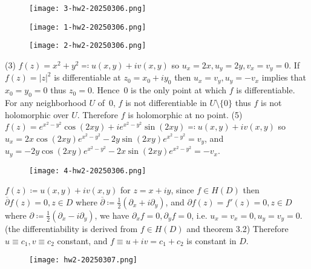 \begin{definition}[解析函数]
\begin{figure}[H]
\centering
\texttt{[image: 3-hw2-20250306.png]}
\label{}
\end{figure}
\end{definition}
\begin{theorem}
\begin{figure}[H]
\centering
\texttt{[image: 1-hw2-20250306.png]}
\label{}
\end{figure}
\end{theorem}
\begin{theorem}
\begin{figure}[H]
\centering
\texttt{[image: 2-hw2-20250306.png]}
\label{}
\end{figure}
\end{theorem}
(3) $f (z)=x^{2}+y^{2}\eqqcolon u (x, y)+i v(x,y)$ so $u_{x}=2x,u_{y}=2y,v_{x}=v_{y}=0$. If $f(z)=\lvert z \rvert ^{2}$ is differentiable at $z_0=x_0+iy_0$ then $u_{x}=v_{y},u_{y}=-v_{x}$ implies that $x_0=y_0=0$ thus $z_0=0$. Hence $\,0$ is the only point at which $f$ is differentiable. For any neighborhood $U$ of $\,0$, $f$ is not differentiable in $U\setminus \{ 0 \}$ thus $f$ is not holomorphic over $U$. Therefore $f$ is holomorphic at no point.
(5) $f (z)=e^{ x^{2}-y^{2} }\cos (2xy)+ie^{ x^{2}-y^{2} }\sin (2xy)\eqqcolon u (x, y)+i v(x,y)$ so $u_{x}=2x\cos(2xy)e^{ x^{2}-y^{2} }-2y\sin(2xy)e^{ x^{2}-y^{2} }=v_{y}$, and $u_{y}=-2y\cos(2xy)e^{ x^{2}-y^{2} }-2x\sin(2xy)e^{ x^{2}-y^{2} }=-v_{x}$.

\begin{figure}[H]
\centering
\texttt{[image: 4-hw2-20250306.png]}
\label{}
\end{figure}

$f (z)\coloneqq u (x, y)+i v(x,y)$ for $z=x+iy$, since $f\in H(D)$ then $\overline{\partial}f (z)=0, z\in D$ where $\overline{\partial}\coloneqq \frac{1}{2}(\partial _{x}+i\partial_{y})$, and $\partial f (z)=f' (z)=0, z\in D$ where $\partial\coloneqq \frac{1}{2}(\partial_{x}-i \partial_{y})$, we have $\partial_{x}f=0,\partial_{y}f=0$, i.e. $u_{x}=v_{x}=0,u_{y}=v_{y}=0$. (the differentiability is derived from $f\in H(D)$ and theorem 3.2) Therefore $u\equiv c_1,v\equiv c_2$ constant, and $f\equiv u+iv=c_1+c_2$ is constant in $D$.

\begin{figure}[H]
\centering
\texttt{[image: hw2-20250307.png]}
\label{}
\end{figure}


